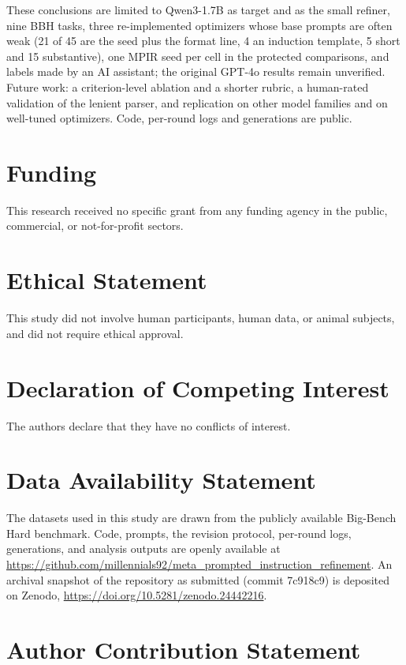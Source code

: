 \documentclass{ieeeaccess}
\begin{document}
These conclusions are limited to Qwen3-1.7B as target and as the small refiner, nine BBH tasks, three re-implemented optimizers whose base prompts are often weak (21 of 45 are the seed plus the format line, 4 an induction template, 5 short and 15 substantive), one MPIR seed per cell in the protected comparisons, and labels made by an AI assistant; the original GPT-4o results remain unverified. Future work: a criterion-level ablation and a shorter rubric, a human-rated validation of the lenient parser, and replication on other model families and on well-tuned optimizers. Code, per-round logs and generations are public.

\section{Funding}

This research received no specific grant from any funding agency in the public, commercial, or not-for-profit sectors.

\section{Ethical Statement}

This study did not involve human participants, human data, or animal subjects, and did not require ethical approval.

\section{Declaration of Competing Interest}

The authors declare that they have no conflicts of interest.

\section{Data Availability Statement}

The datasets used in this study are drawn from the publicly available Big-Bench Hard benchmark. Code, prompts, the revision protocol, per-round logs, generations, and analysis outputs are openly available at \url{https://github.com/millennials92/meta_prompted_instruction_refinement}. An archival snapshot of the repository as submitted (commit 7c918c9) is deposited on Zenodo, \url{https://doi.org/10.5281/zenodo.24442216}.

\section{Author Contribution Statement}
\end{document}
